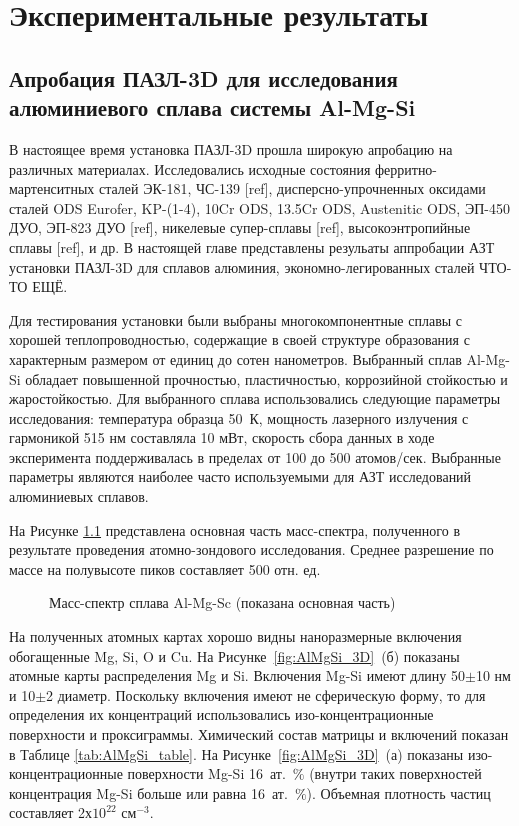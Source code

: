 \chapter{Экспериментальные результаты}\label{ch:ch4}

\section{Апробация ПАЗЛ-3D для исследования алюминиевого сплава системы Al-Mg-Si}\label{sec:ch4/sect1}

В настоящее время установка ПАЗЛ-3D прошла широкую апробацию на различных материалах. Исследовались исходные состояния ферритно-мартенситных сталей ЭК-181, ЧС-139 [ref], дисперсно-упрочненных оксидами сталей ODS Eurofer, KP-(1-4), 10Cr ODS, 13.5Cr ODS, Austenitic ODS, ЭП-450 ДУО, ЭП-823 ДУО [ref], никелевые супер-сплавы [ref],  высокоэнтропийные сплавы [ref], и др. В настоящей главе представлены резульаты аппробации АЗТ установки ПАЗЛ-3D для сплавов алюминия, экономно-легированных сталей ЧТО-ТО ЕЩЁ.

Для тестирования установки были выбраны многокомпонентные сплавы с хорошей теплопроводностью, содержащие в своей структуре образования с характерным размером от единиц до сотен нанометров. Выбранный сплав Al-Mg-Si обладает повышенной прочностью, пластичностью, коррозийной стойкостью и жаростойкостью. Для выбранного сплава использовались следующие параметры исследования: температура образца 50~К, мощность лазерного излучения с гармоникой 515 нм составляла 10 мВт, скорость сбора данных в ходе эксперимента поддерживалась в пределах от 100 до 500 атомов/сек. Выбранные параметры являются наиболее часто используемыми для АЗТ исследований алюминиевых сплавов.

На Рисунке \cref{fig:AlMgSi_mass} представлена основная часть масс-спектра, полученного в результате проведения атомно-зондового исследования. Среднее разрешение по массе на полувысоте пиков составляет 500 отн. ед.

\begin{figure}[htb]
	\caption{Масс-спектр сплава Al-Mg-Sc (показана основная часть)\cite{scbibAlumYAFI}}
	\label{fig:AlMgSi_mass}
\end{figure} 
\FloatBarrier

На полученных атомных картах хорошо видны наноразмерные включения обогащенные Mg, Si, O и Cu. На Рисунке~\cref{fig:AlMgSi_3D}~(б) показаны атомные карты распределения Mg и Si. Включения Mg-Si имеют длину 50$\pm$10 нм и 10$\pm$2 диаметр. Поскольку включения имеют не сферическую форму, то для определения их концентраций использовались изо-концентрационные поверхности и проксиграммы. Химический состав матрицы и включений показан в Таблице \cref{tab:AlMgSi_table}. На Рисунке~\cref{fig:AlMgSi_3D}~(а) показаны изо-концентрационные поверхности Mg-Si 16~ат.~$\%$ (внутри таких поверхностей концентрация Mg-Si больше или равна 16~ат.~$\%$). Объемная плотность частиц составляет 2х$10^{22}$ см$^{-3}$.

